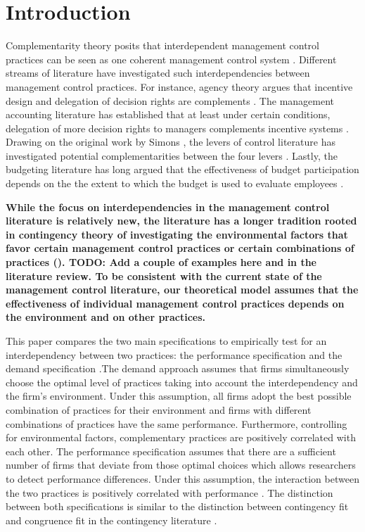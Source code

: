 \documentclass[12pt]{article}
\begin{document}
\section{Introduction}\label{introduction}

 Complementarity theory posits that interdependent management control practices can be seen as one coherent management control system \citep{Milgrom1995, Grabner2013}. Different streams of literature have investigated such interdependencies between management control practices. For instance, agency theory argues that incentive design and delegation of decision rights are complements \citep{Holmstrom1994}. The management accounting literature has established that at least under certain conditions, delegation of more decision rights to managers complements incentive systems \citep{Moers2006, Indjejikian2012, Bouwens2007}. Drawing on the original work by Simons \citetext{\citeyear{Simons1995}; \citeyear{Simons2000}}, the levers of control literature has investigated potential complementarities between the four levers \citep{Widener2007}. Lastly, the budgeting literature has long argued that the effectiveness of budget participation depends on the the extent to which the budget is used to evaluate employees \citep{Brownell1991, Dunk1993}.
 
 \textbf{While the focus on interdependencies in the management control literature is relatively new, the literature has a longer tradition rooted in contingency theory of investigating the environmental factors that favor certain management control practices or certain combinations of practices (\citet{Grabner2013}). TODO: Add a couple of examples here and in the literature review. To be consistent with the current state of the management control literature, our theoretical model assumes that the effectiveness of individual management control practices depends on the environment and on other practices.}
 
 This paper compares the two main specifications to empirically test for an interdependency between two practices: the performance specification and the demand specification \citep{Grabner2013}.The demand approach assumes that firms simultaneously choose the optimal level of practices taking into account the interdependency and the firm's environment. Under this assumption, all firms adopt the best possible combination of practices for their environment and firms with different combinations of practices have the same performance. Furthermore, controlling for environmental factors, complementary practices are positively correlated with each other. The performance specification assumes that there are a sufficient number of firms that deviate from those optimal choices which allows researchers to detect performance differences. Under this assumption, the interaction between the two practices is positively correlated with performance \citep{Athey1998, Grabner2013}. The distinction between both specifications is similar to the distinction between contingency fit and congruence fit in the contingency literature \citep{VandeVen1985a, Gerdin2004}. 
\end{document}
